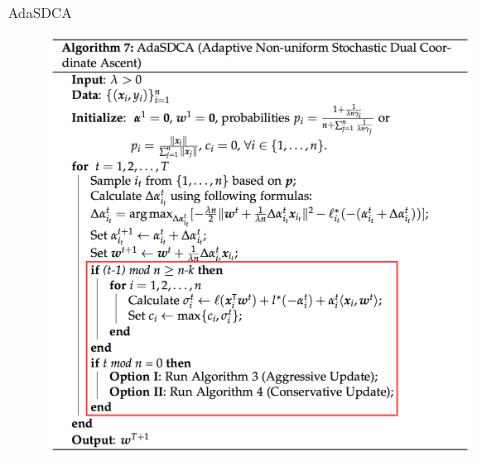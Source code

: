 \begin{frame}{AdaSDCA}
\begin{figure}[H]
        \includegraphics[height=0.8\textheight]{images/AdaSDCA.png} 
    \label{fig:AdaSDCA}
\end{figure}
\end{frame}
